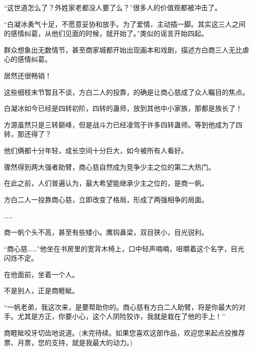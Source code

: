 \begin{this_body}
“这世道怎么了？外姓家老都没人要了么？”很多人的价值观都被冲击了。

“白凝冰勇气十足，不愿意妥协和放手。为了爱情，主动插一脚。其实这三人之间的感情纠葛，从他们见面的时候，就开始了。”类似的谣言开始四起。

群众想象出无数情节，甚至商家城都开始出现画本和戏剧，描述方白商三人无比虐心的感情纠葛。

居然还很畅销！

这些细枝末节暂且不谈，方白二人的投靠，的确是让商心慈成了众人瞩目的焦点。

白凝冰如今已经是四转初阶，四转的蛊师，放到其他中小家族，那都是族长了！

方源虽然只是三转巅峰，但是战斗力已经凌驾于许多四转蛊师。等到他成为了四转，那还得了？

他们俩都十分年轻，成长空间十分巨大，如今被所有人看好。

骤然得到两大强者助臂，商心慈自然成为竞争少主之位的第二大热门。

在此之前，人们普遍认为，最大希望能继承少主之位的，是商一帆。

方白二人一投靠商心慈，立即改变了格局，形成了两强相争的局面。

……

商一帆个头不高，甚至有些矮小。鹰钩鼻梁，双目狭小，目光锐利。

“商心慈……”他坐在书房里的宽背木椅上，口中轻声喃喃，咀嚼着这个名字，目光闪烁不定。

在他面前，坐着一个人。

不是别人，正是商睚眦。

“一帆老弟，我这次来，是要帮助你的。商心慈有方白二人助臂，将是你最大的对手。尤其是方正，你要小心，这个人阴险狡诈，我就是栽在了他的手上！”

商睚眦咬牙切齿地说道。(未完待续。如果您喜欢这部作品，欢迎您来起点投推荐票、月票，您的支持，就是我最大的动力。)

\end{this_body}

